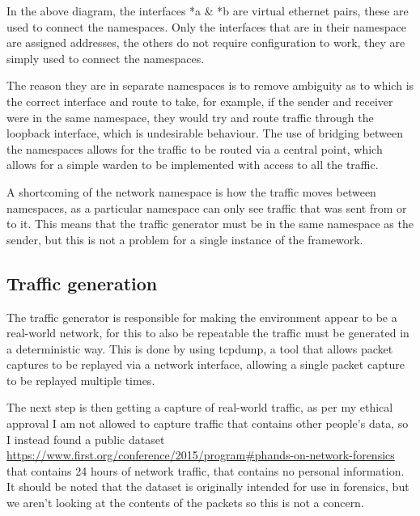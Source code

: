 In the above diagram, the interfaces *a \& *b are virtual ethernet pairs, these are used to connect the namespaces. Only the interfaces that are in their namespace are assigned addresses, the others do not require configuration to work, they are simply used to connect the namespaces.

The reason they are in separate namespaces is to remove ambiguity as to which is the correct interface and route to take, for example, if the sender and receiver were in the same namespace, they would try and route traffic through the loopback interface, which is undesirable behaviour. The use of bridging between the namespaces allows for the traffic to be routed via a central point, which allows for a simple warden to be implemented with access to all the traffic.

A shortcoming of the network namespace is how the traffic moves between namespaces, as a particular namespace can only see traffic that was sent from or to it. This means that the traffic generator must be in the same namespace as the sender, but this is not a problem for a single instance of the framework.

\subsection{Traffic generation}

The traffic generator is responsible for making the environment appear to be a real-world network, for this to also be repeatable the traffic must be generated in a deterministic way. This is done by using tcpdump, a tool that allows packet captures to be replayed via a network interface, allowing a single packet capture to be replayed multiple times.

The next step is then getting a capture of real-world traffic, as per my ethical approval I am not allowed to capture traffic that contains other people's data, so I instead found a public dataset \url{https://www.first.org/conference/2015/program#phands-on-network-forensics} that contains 24 hours of network traffic, that contains no personal information. It should be noted that the dataset is originally intended for use in forensics, but we aren't looking at the contents of the packets so this is not a concern.

